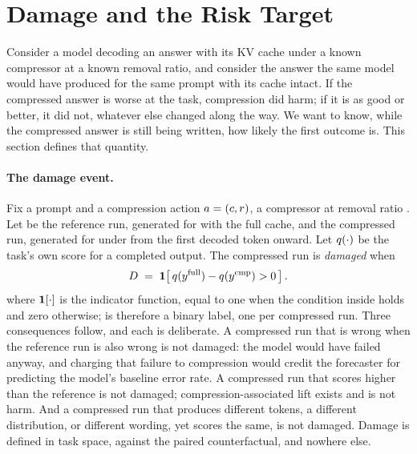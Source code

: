 \section{Damage and the Risk Target}
\label{sec:target}

Consider a model decoding an answer with its KV cache under a known
compressor at a known removal ratio, and consider the answer the same model
would have produced for the same prompt with its cache intact. If the
compressed answer is worse at the task, compression did harm; if it is as
good or better, it did not, whatever else changed along the way. We want to
know, while the compressed answer is still being written, how likely the
first outcome is. This section defines that quantity.

\paragraph{The damage event.}
Fix a prompt \prompt{} and a compression action $a = (c, r)$, a
compressor \press{} at removal ratio \ratio. Let \yfull{} be the reference
run, generated for \prompt{} with the full cache, and \ycmp{} the compressed
run, generated for \prompt{} under \action{} from the first decoded token
onward. Let $q(\cdot)$ be the task's own score for a completed output. The compressed run is \emph{damaged} when
\begin{equation}
D \;=\; \mathbf{1}\!\left[\, q(y^{\mathrm{full}}) - q(y^{\mathrm{cmp}}) > 0 \,\right].
\label{eq:damage}
\end{equation}
where $\mathbf{1}\!\left[\cdot\right]$ is the indicator function, equal to one when the
condition inside holds and zero otherwise; \dmg{} is therefore a binary
label, one per compressed run. Three consequences follow, and each is
deliberate. A compressed run that is
wrong when the reference run is also wrong is not damaged: the model would
have failed anyway, and charging that failure to compression would credit the
forecaster for predicting the model's baseline error rate. A compressed run
that scores higher than the reference is not damaged; compression-associated
lift exists and is not harm. And a compressed run that produces different
tokens, a different distribution, or different wording, yet scores the same,
is not damaged. Damage is defined in task space, against the paired
counterfactual, and nowhere else.

